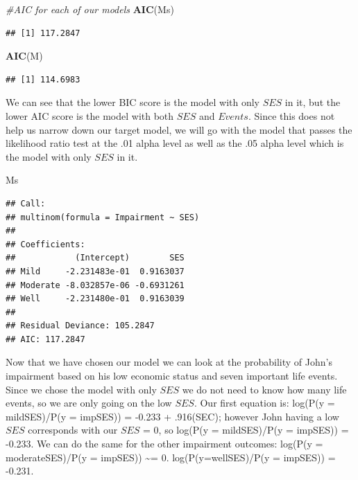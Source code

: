 \documentclass[
]{article}
\newenvironment{Shaded}{\begin{snugshade}}{\end{snugshade}}
\newcommand{\CommentTok}[1]{\textcolor[rgb]{0.56,0.35,0.01}{\textit{#1}}}
\newcommand{\FunctionTok}[1]{\textcolor[rgb]{0.13,0.29,0.53}{\textbf{#1}}}
\newcommand{\NormalTok}[1]{#1}
\begin{document}
\begin{Shaded}
\begin{Highlighting}[]
\CommentTok{\#AIC for each of our models}
\FunctionTok{AIC}\NormalTok{(Ms)}
\end{Highlighting}
\end{Shaded}

\begin{verbatim}
## [1] 117.2847
\end{verbatim}

\begin{Shaded}
\begin{Highlighting}[]
\FunctionTok{AIC}\NormalTok{(M)}
\end{Highlighting}
\end{Shaded}

\begin{verbatim}
## [1] 114.6983
\end{verbatim}

We can see that the lower BIC score is the model with only \(SES\) in
it, but the lower AIC score is the model with both \(SES\) and
\(Events\). Since this does not help us narrow down our target model, we
will go with the model that passes the likelihood ratio test at the .01
alpha level as well as the .05 alpha level which is the model with only
\(SES\) in it.

\begin{Shaded}
\begin{Highlighting}[]
\NormalTok{Ms}
\end{Highlighting}
\end{Shaded}

\begin{verbatim}
## Call:
## multinom(formula = Impairment ~ SES)
## 
## Coefficients:
##            (Intercept)        SES
## Mild     -2.231483e-01  0.9163037
## Moderate -8.032857e-06 -0.6931261
## Well     -2.231480e-01  0.9163039
## 
## Residual Deviance: 105.2847 
## AIC: 117.2847
\end{verbatim}

Now that we have chosen our model we can look at the probability of
John's impairment based on his low economic status and seven important
life events. Since we chose the model with only \(SES\) we do not need
to know how many life events, so we are only going on the low \(SES\).
Our first equation is: log(P(y = mild\textbar SES)/P(y =
imp\textbar SES)) = -0.233 + .916(SEC); however John having a low
\(SES\) corresponds with our \(SES\) = 0, so log(P(y =
mild\textbar SES)/P(y = imp\textbar SES)) = -0.233. We can do the same
for the other impairment outcomes: log(P(y = moderate\textbar SES)/P(y =
imp\textbar SES)) \textasciitilde= 0. log(P(y=well\textbar SES)/P(y =
imp\textbar SES)) = -0.231.
\end{document}
